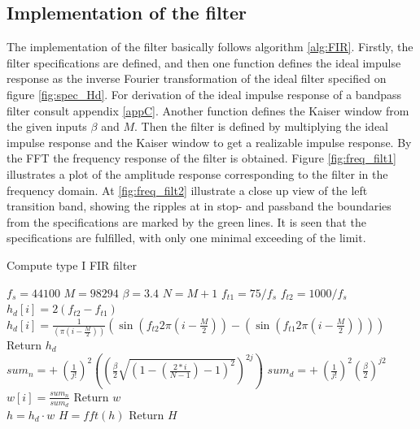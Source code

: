 \subsection{Implementation of the filter}
The implementation of the filter basically follows algorithm \ref{alg:FIR}. Firstly, the filter specifications are defined, and then one function defines the ideal impulse response as the inverse Fourier transformation of the ideal filter specified on figure \ref{fig:spec_Hd}. For derivation of the ideal impulse response of a bandpass filter consult appendix \ref{appC}. Another function defines the Kaiser window from the given inputs $\beta$ and $M$. Then the filter is defined by multiplying the ideal impulse response and the Kaiser window to get a realizable impulse response. By the FFT the frequency response of the filter is obtained. Figure \ref{fig:freq_filt1} illustrates a plot of the amplitude response corresponding to the filter in the frequency domain. At \ref{fig:freq_filt2} illustrate a close up view of the left transition band, showing the ripples at in stop- and passband  the boundaries from the specifications are marked by the green lines. It is seen that the specifications are fulfilled, with only one minimal exceeding of the limit.        

\begin{algorithm}[H]
\caption{Compute type I FIR filter}
\label{alg:FIR}
\begin{algorithmic}[1] 
\State $f_s= 44100$ 
\State $M = 98294$  
\State $\beta = 3.4$ 
\State $N = M+1$ 
\State $f_{t1} = 75/f_s$ 
\State $f_{t2} = 1000/f_s$ 
\\
        		\State $h_d[i] = 2(f_{t2} - f_{t1})$
        	\Else 
        		\State  $h_d[i] = \frac{1}{ (\pi (i - \frac{M}{2}))}(\sin(f_{t2} 2 \pi (i - \frac{M}{2})) - (\sin(f_{t1} 2 \pi (i - \frac{M}{2}))))$ 
        	\EndIf 
	\EndFor
	\State Return $h_d$
\EndProcedure
\\
			\State $ sum_n = + \ (\frac{1}{j!})^2 \left( \left( \frac{\beta}{2} \sqrt{\left(1 - \left( \frac{2*i}{N-1}\right) - 1\right)^2}\right)^{2j}\right)$
			\State $ sum_d = + \ (\frac{1}{j!})^2 \left( \frac{\beta}{2}\right)^{j2}$
		\EndFor
		\State $w[i]=\frac{sum_n}{sum_d}$
	\EndFor
	\State Return $w$
\EndProcedure
\\
	\State $h = h_d \cdot w$ 
	\State $H = fft(h)$ 
	\State Return $H$
\EndProcedure

\end{algorithmic}
\end{algorithm}

